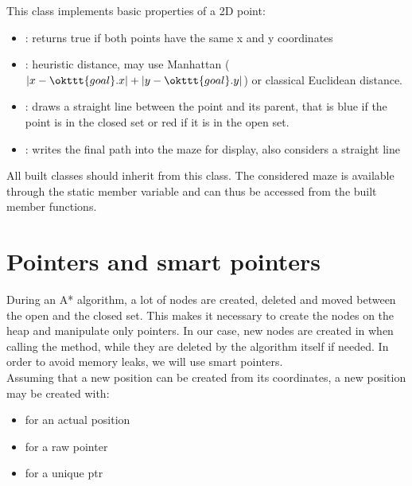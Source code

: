 \documentclass{ecnreport}
\begin{document}
This class implements basic properties of a 2D point:

\begin{itemize}
 \item {}: returns true if both points have the same x and y coordinates
 \item {}: heuristic distance, may use Manhattan
 ($|x-\okttt{goal}.x| + |y-\okttt{goal}.y|$) or classical Euclidean distance.
 \item {}: draws a straight line between the point and its parent, that
 is blue if the point is in the closed set or red if it is in the open set.
 \item {}: writes the final path into the maze for display, also considers a straight line
\end{itemize}
All built classes should inherit from this class. The considered maze is available through the static member variable  and can thus
be accessed from the built member functions.

\section{Pointers and smart pointers}\label{smart}

During an A* algorithm, a lot of nodes are created, deleted and moved between the open and the closed set.
This makes it necessary to create the nodes on the heap and manipulate only pointers. 
In our case, new nodes are created in when calling the  method, while they are deleted by the algorithm
itself if needed. In order to avoid memory leaks, we will use smart pointers.\\

Assuming that a new position can be created from its coordinates, a new position may be created with:
\begin{itemize}
\item {} for an actual position
 \item {} for a raw pointer
 \item {} for a unique ptr
\end{itemize}
\end{document}
